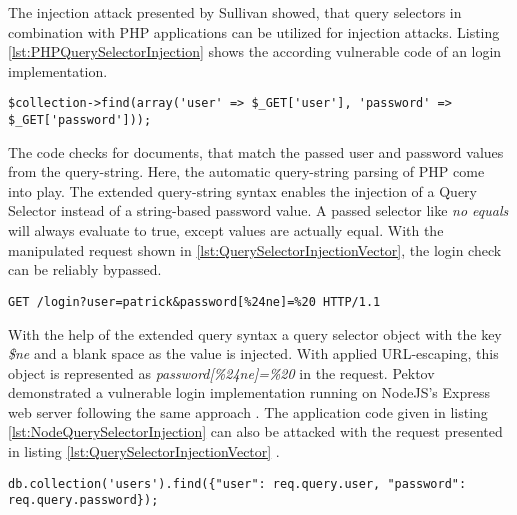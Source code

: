 The injection attack presented by Sullivan \cite{Sullivan:2011} showed, that query selectors in combination with PHP applications can be utilized for injection attacks. Listing \ref{lst:PHPQuerySelectorInjection} shows the according vulnerable code of an login implementation. \\

\begin{lstlisting}[caption={Vulnerable PHP example for query selector injection against MongoDB}, label={lst:PHPQuerySelectorInjection}]
$collection->find(array('user' => $_GET['user'], 'password' => $_GET['password']));
\end{lstlisting}

The code checks for documents, that match the passed user and password values from the query-string. Here, the automatic query-string parsing of PHP come into play. The extended query-string syntax enables the injection of a Query Selector instead of a string-based password value. A passed selector like \emph{no equals} will always evaluate to true, except values are actually equal. With the manipulated request shown in \ref{lst:QuerySelectorInjectionVector}, the login check can be reliably bypassed. \\

\begin{lstlisting}[caption={Attack vector against MongoDB for query selector injection via the query-string parameter}, label={lst:QuerySelectorInjectionVector}]
GET /login?user=patrick&password[%24ne]=%20 HTTP/1.1
\end{lstlisting}

With the help of the extended query syntax a query selector object with the key \emph{\$ne} and a blank space as the value is injected. With applied URL-escaping, this object is represented as \emph{password[\%24ne]=\%20} in the request. Pektov demonstrated a vulnerable login implementation running on NodeJS's Express web server following the same approach \cite{Petkov:2014a}. The application code given in listing \ref{lst:NodeQuerySelectorInjection} can also be attacked with the request presented in listing \ref{lst:QuerySelectorInjectionVector} . \\

\begin{lstlisting}[caption={Vulnerable NodeJS example for query selector injection against MongoDB}, label={lst:NodeQuerySelectorInjection}]
db.collection('users').find({"user": req.query.user, "password": req.query.password});
\end{lstlisting}

